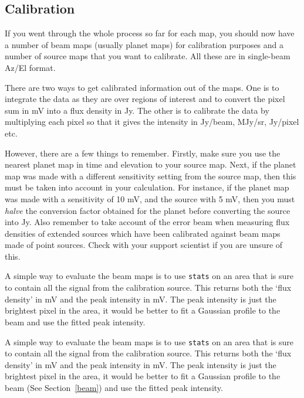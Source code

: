 \documentclass[11pt]{article}
\newenvironment{latexonly}{}{}
\newcommand{\htmlref}[2]{#1}
\newcommand{\xref}[3]{#1}
\newcommand{\xlabel}[1]{}
\begin{document}
\subsection{\label{calib}\xlabel{calib}Calibration}

   If you went through the whole process so far for each map, you should
   now have a number of beam maps (usually planet maps) for calibration
   purposes and a number of source maps that you want to calibrate. All
   these are in single-beam Az/El format.

   There are two ways to get calibrated information out of the maps. One
   is to integrate the data as they are over regions of interest and to
   convert the pixel sum in mV into a
\htmlref{flux density}{glossflux}
   in Jy. The other is to calibrate the data by multiplying each pixel
   so that it gives the
\htmlref{intensity}{glossflux}
   in Jy/beam, MJy/sr, Jy/pixel etc.

   However, there are a few things to remember. Firstly, make sure you
   use the nearest
\htmlref{planet map}{glossplanetmap}
   in time and elevation to your source map. Next, if the planet map was
   made with a different
\htmlref{sensitivity setting}{glosssensset}
   from the source map, then this must be taken into account in your
   calculation. For instance, if the planet map was made with a
   sensitivity of 10 mV, and the source with 5 mV, then you must
   {\it halve\/} the conversion factor obtained for the planet before
   converting the source into Jy. Also remember to take account of the
\htmlref{error beam}{glosserrorbeam}
   when measuring flux densities of extended
   sources which have been calibrated against beam maps made of point
   sources. Check with your support scientist if you are unsure of this.

\begin{htmlonly}
   A simple way to evaluate the beam maps is to use
{\tt \xref{stats}{sun95}{STATS}}
   on an area that is sure to contain all the signal from the
   calibration source. This returns both the `flux density' in mV and
   the peak intensity in mV. The peak intensity is just the brightest
   pixel in the area, it would be better to
\htmlref{fit a Gaussian profile to the beam}{beam}
   and use the fitted peak intensity.
\end{htmlonly}
\begin{latexonly}
   A simple way to evaluate the beam maps is to use
{\tt \xref{stats}{sun95}{STATS}}
   on an area that is sure to contain all the signal from the
   calibration source. This returns both the `flux density' in mV and
   the peak intensity in mV. The peak intensity is just the brightest
   pixel in the area, it would be better to
   fit a Gaussian profile to the beam
(See Section~\ref{beam})
   and use the fitted peak intensity.
\end{latexonly}
\end{document}
